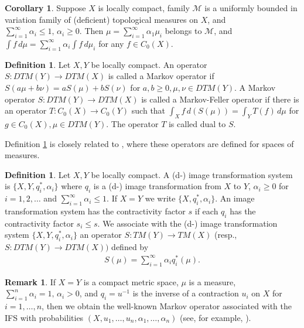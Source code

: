 \documentclass[sn-mathphys-num]{sn-jnl}%
\theoremstyle{thmstyleone}%
\theoremstyle{definition}
\newtheorem{corollary}[theorem]{Corollary}
\newtheorem{definition}[theorem]{Definition}
\newtheorem{remark}[theorem]{Remark}
\begin{document}
\begin{corollary} \label{inftSuDTM}
Suppose $X$ is locally compact, 
family $\mathcal{M}$ is a uniformly bounded in variation family of (deficient) topological measures on $X$, and 
$\sum_{i=1}^\infty \alpha_i \le 1, \, \alpha_i \ge 0$.
Then $\mu = \sum_{i=1}^\infty  \alpha_1 \mu_i$  belongs to $\mathcal{M}$,  and 
$ \int f \, d \mu = \sum_{i=1}^\infty  \alpha_i  \int f\, d \mu_i$ for any $ f \in C_0(X)$.  
\end{corollary}

\begin{definition} \label{DefMarkovOp}
Let $X,Y$ be locally compact. 
An operator $S: DTM(Y) \longrightarrow DTM(X)$ is called a Markov operator if 
$ S(a \mu + b \nu) = a S(\mu) + b S(\nu)$ for $a,b \ge 0, \mu, \nu \in DTM(Y)$.
A Markov operator $S: DTM(Y) \longrightarrow DTM(X)$ is called a Markov-Feller operator if there is an operator
$T: C_0(X) \longrightarrow C_0(Y)$ such that $ \int_X f \, d(S(\mu)) = \int_Y T(f) \, d\mu $ for $g \in C_0(X), \mu \in DTM(Y)$.  
The operator $T$ is called dual to $S$.
\end{definition}

\noindent
Definition \ref{DefMarkovOp} is closely related to \cite[p. 345]{LasotaMyjakSzarek}, where these operators are defined for spaces of measures. 

\begin{definition}
Let $X,Y$ be locally compact. 
A (d-) image transformation system is  
$\{ X,  Y, q_i^*, \alpha_i \} $ where $q_i$ is a (d-) image transformation from $X$ to $Y$, 
$\alpha_i \ge 0$ for $ i = 1, 2, \ldots$ and $\sum_{i=1}^\infty \alpha_i \le 1$. 
If $X =Y$ we write $\{ X, q_i^*, \alpha_i \} $. 
An image transformation system has the contractivity factor  $s$ if each $q_i$ has the  contractivity factor $ s_i \le s $.  
We associate with the (d-) image transformation system $\{ X, Y, q_i^*, \alpha_i \} $ an operator 
$S:TM(Y) \longrightarrow TM(X)$ (resp.,  $S: DTM(Y) \longrightarrow DTM(X))$  
defined by
\begin{align} \label{MarkovS} 
S(\mu) = \sum_{i=1}^\infty \alpha_i q_i^* (\mu). 
\end{align}
\end{definition} 

\begin{remark}
If $X=Y$ is a compact metric space, $ \mu$ is a measure, $\sum_{i=1}^n \alpha_i = 1, \,  \alpha_i > 0$,
and $q_i= u^{-1}$ is the inverse of a contraction $u_i$ on $X$ for $i=1, \ldots, n$, then we obtain the well-known Markov operator associated with the
IFS with probabilities $(X, u_1, \ldots, u_n, \alpha_1, \ldots, \alpha_n)$  (see, for example, \cite[Ch.9, \S 6]{Barnsley}). 
\end{remark}
\end{document}
